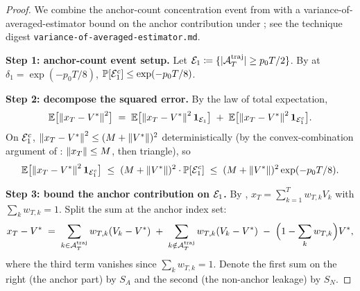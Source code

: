 \begin{proof}
We combine the anchor-count concentration event from
 with a variance-of-averaged-estimator bound on
the anchor contribution under ; see the
technique digest \texttt{variance-of-averaged-estimator.md}.

\noindent\textbf{Step 1: anchor-count event setup.}
Let $\mathcal{E}_1 \coloneqq \{|\mathcal{A}^{\mathrm{traj}}_T| \ge p_0 T/2\}$. By
 at $\delta_1 = \exp(-p_0 T/8)$, $\mathbb{P}[\mathcal{E}_1^c] \le \exp(-p_0 T/8)$.

\noindent\textbf{Step 2: decompose the squared error.}
By the law of total expectation,
\begin{align*}
   \mathbb{E}\bigl[\left\| x_T - V^* \right\|^2\bigr]
   \;=\; \mathbb{E}\bigl[\left\| x_T - V^* \right\|^2 \mathbf{1}_{\mathcal{E}_1}\bigr]
       \;+\; \mathbb{E}\bigl[\left\| x_T - V^* \right\|^2 \mathbf{1}_{\mathcal{E}_1^c}\bigr].
\end{align*}
On $\mathcal{E}_1^c$, $\left\| x_T - V^* \right\|^2 \le (M + \left\| V^* \right\|)^2$ deterministically
(by the convex-combination argument of :
$\left\| x_T \right\| \le M$, then triangle), so
\begin{align}\label{eq:vr_offE1}
   \mathbb{E}\bigl[\left\| x_T - V^* \right\|^2 \mathbf{1}_{\mathcal{E}_1^c}\bigr]
   \;\le\;
   (M + \left\| V^* \right\|)^2 \cdot \mathbb{P}[\mathcal{E}_1^c]
   \;\le\;
   (M + \left\| V^* \right\|)^2 \exp(-p_0 T/8).
\end{align}

\noindent\textbf{Step 3: bound the anchor contribution on $\mathcal{E}_1$.}
By ,
$x_T = \sum_{k=1}^T w_{T,k} V_k$ with $\sum_k w_{T,k} = 1$. Split the sum
at the anchor index set:
\begin{align}\label{eq:vr_decomp}
   x_T - V^*
   \;=\;
   \sum_{k \in \mathcal{A}^{\mathrm{traj}}_T} w_{T,k} (V_k - V^*)
   \;+\;
   \sum_{k \notin \mathcal{A}^{\mathrm{traj}}_T} w_{T,k} (V_k - V^*)
   \;-\;
   \Bigl(1 - \sum_k w_{T,k}\Bigr) V^*,
\end{align}
where the third term vanishes since $\sum_k w_{T,k} = 1$. Denote the
first sum on the right (the anchor part) by $S_A$ and the second (the
non-anchor leakage) by $S_N$.


\end{proof}
